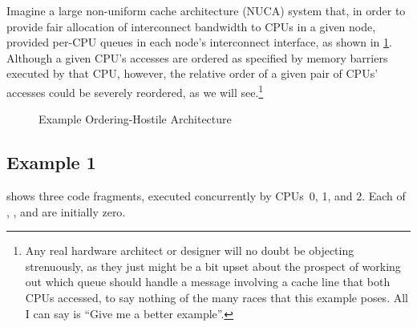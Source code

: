 Imagine a large non-uniform cache architecture (NUCA) system that,
in order to provide fair allocation
of interconnect bandwidth to CPUs in a given node, provided per-CPU
queues in each node's interconnect interface, as shown in
\cref{fig:app:whymb:Example Ordering-Hostile Architecture}.
Although a given CPU's accesses are ordered as specified by memory
barriers executed by that CPU, however, the relative order of a
given pair of CPUs' accesses could be severely reordered,
as we will see.\footnote{
	Any real hardware architect or designer will no doubt be
	objecting strenuously,
	as they just might be a bit upset about the prospect of working
	out which queue should handle a message involving a cache line
	that both CPUs accessed, to say nothing of the many races that
	this example poses.
	All I can say is ``Give me a better example''.}

\begin{figure}[htb]
\centering
{}
\caption{Example Ordering-Hostile Architecture}
\label{fig:app:whymb:Example Ordering-Hostile Architecture}
\end{figure}

\subsection{Example 1}
\label{sec:app:whymb:Example 1}

shows three code fragments, executed concurrently by CPUs~0, 1, and 2.
Each of , , and  are initially zero.


\begin{listing}
\scriptsize
{}
\caption{Memory Barrier Example 1}
\label{lst:app:whymb:Memory Barrier Example 1}
\end{listing}

